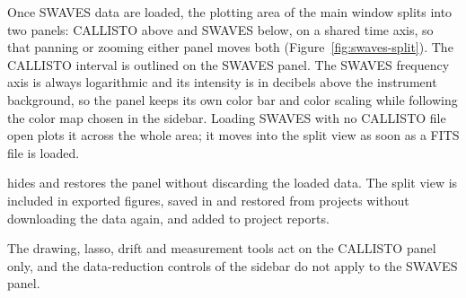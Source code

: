 Once SWAVES data are loaded, the plotting area of the main window splits into two panels:
CALLISTO above and SWAVES below, on a shared time axis, so that panning or zooming either
panel moves both (Figure~\ref{fig:swaves-split}). The CALLISTO interval is outlined on the
SWAVES panel. The SWAVES frequency axis is always logarithmic and its intensity is in
decibels above the instrument background, so the panel keeps its own color bar and color
scaling while following the color map chosen in the sidebar. Loading SWAVES with no
CALLISTO file open plots it across the whole area; it moves into the split view as soon as a
FITS file is loaded.


 hides and restores the panel without discarding the
loaded data. The split view is included in exported figures, saved in and restored from
projects without downloading the data again, and added to project reports.

\begin{note}
  The drawing, lasso, drift and measurement tools act on the CALLISTO panel only, and the
  data-reduction controls of the sidebar do not apply to the SWAVES panel.
\end{note}

